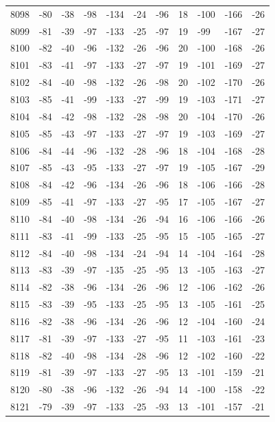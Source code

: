 \begin{table}[H]
\begin{tabular}{lllllllllll}
8098 & -80 & -38 & -98 & -134 & -24 & -96 & 18 & -100 & -166 & -26 \\
8099 & -81 & -39 & -97 & -133 & -25 & -97 & 19 & -99 & -167 & -27 \\
8100 & -82 & -40 & -96 & -132 & -26 & -96 & 20 & -100 & -168 & -26 \\
8101 & -83 & -41 & -97 & -133 & -27 & -97 & 19 & -101 & -169 & -27 \\
8102 & -84 & -40 & -98 & -132 & -26 & -98 & 20 & -102 & -170 & -26 \\
8103 & -85 & -41 & -99 & -133 & -27 & -99 & 19 & -103 & -171 & -27 \\
8104 & -84 & -42 & -98 & -132 & -28 & -98 & 20 & -104 & -170 & -26 \\
8105 & -85 & -43 & -97 & -133 & -27 & -97 & 19 & -103 & -169 & -27 \\
8106 & -84 & -44 & -96 & -132 & -28 & -96 & 18 & -104 & -168 & -28 \\
8107 & -85 & -43 & -95 & -133 & -27 & -97 & 19 & -105 & -167 & -29 \\
8108 & -84 & -42 & -96 & -134 & -26 & -96 & 18 & -106 & -166 & -28 \\
8109 & -85 & -41 & -97 & -133 & -27 & -95 & 17 & -105 & -167 & -27 \\
8110 & -84 & -40 & -98 & -134 & -26 & -94 & 16 & -106 & -166 & -26 \\
8111 & -83 & -41 & -99 & -133 & -25 & -95 & 15 & -105 & -165 & -27 \\
8112 & -84 & -40 & -98 & -134 & -24 & -94 & 14 & -104 & -164 & -28 \\
8113 & -83 & -39 & -97 & -135 & -25 & -95 & 13 & -105 & -163 & -27 \\
8114 & -82 & -38 & -96 & -134 & -26 & -96 & 12 & -106 & -162 & -26 \\
8115 & -83 & -39 & -95 & -133 & -25 & -95 & 13 & -105 & -161 & -25 \\
8116 & -82 & -38 & -96 & -134 & -26 & -96 & 12 & -104 & -160 & -24 \\
8117 & -81 & -39 & -97 & -133 & -27 & -95 & 11 & -103 & -161 & -23 \\
8118 & -82 & -40 & -98 & -134 & -28 & -96 & 12 & -102 & -160 & -22 \\
8119 & -81 & -39 & -97 & -133 & -27 & -95 & 13 & -101 & -159 & -21 \\
8120 & -80 & -38 & -96 & -132 & -26 & -94 & 14 & -100 & -158 & -22 \\
8121 & -79 & -39 & -97 & -133 & -25 & -93 & 13 & -101 & -157 & -21 \\

\end{tabular}
\end{table}
